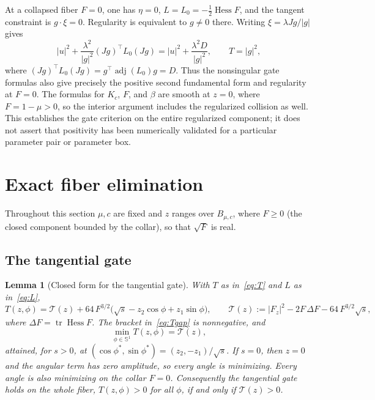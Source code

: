 \documentclass[11pt,reqno]{amsart}
\theoremstyle{plain}
\newtheorem{lemma}[theorem]{Lemma}
\theoremstyle{definition}
\DeclareMathOperator{\tr}{tr}
\DeclareMathOperator{\Hess}{Hess}
\newcommand{\Sph}{\mathbb{S}}
\newcommand{\calT}{\mathcal{T}}
\newcommand{\Fz}{F_{z}}
\begin{document}
At a collapsed fiber $F=0$, one has $\eta=0$, $L=L_0=-\tfrac12
\operatorname{Hess}F$, and the tangent constraint is $g\cdot\xi=0$.
Regularity is equivalent to $g\ne0$ there.  Writing
$\xi=\lambda Jg/|g|$ gives
\[
 |u|^2+\frac{\lambda^2}{|g|^2}(Jg)^\top L_0(Jg)
 =|u|^2+\frac{\lambda^2D}{|g|^2},
 \qquad T=|g|^2,
\]
where $(Jg)^\top L_0(Jg)=g^\top\operatorname{adj}(L_0)g=D$.
Thus the nonsingular gate formulas also give precisely the positive second
fundamental form and regularity at $F=0$.  The formulas for $K_c$, $F$,
and $\beta$ are smooth at $z=0$, where $F=1-\mu>0$, so the interior
argument includes the regularized collision as well.  This establishes
the gate criterion on the entire regularized component; it does not assert
that positivity has been numerically validated for a particular parameter
pair or parameter box.

\section{Exact fiber elimination}\label{sec:elimination}

Throughout this section $\mu,c$ are fixed and $z$ ranges over $B_{\mu,c}$, where $F\ge 0$ (the closed component bounded by the collar), so that $\sqrt{F}$ is real.

\subsection{The tangential gate}

\begin{lemma}[Closed form for the tangential gate]\label{lem:T}
With $T$ as in~\eqref{eq:T} and $L$ as in~\eqref{eq:L},
\begin{equation}\label{eq:Tgap}
T(z,\phi)=\calT(z)+64\,F^{3/2}\bigl(\sqrt{s}-z_2\cos\phi+z_1\sin\phi\bigr),
\qquad
\calT(z):=|\Fz|^2-2F\,\Delta F-64\,F^{3/2}\sqrt{s},
\end{equation}
where $\Delta F=\tr\Hess F$. The bracket in~\eqref{eq:Tgap} is nonnegative, and
\begin{equation}\label{eq:Tmin}
\min_{\phi\in\Sph^1} T(z,\phi)=\calT(z),
\end{equation}
attained, for $s>0$, at $(\cos\phi^\ast,\sin\phi^\ast)=(z_2,-z_1)/\sqrt{s}$. If $s=0$, then $z=0$ and the angular term has zero amplitude, so every angle is minimizing. Every angle is also minimizing on the collar $F=0$. Consequently the tangential gate holds on the whole fiber, $T(z,\phi)>0$ for all $\phi$, if and only if $\calT(z)>0$.
\end{lemma}
\end{document}
